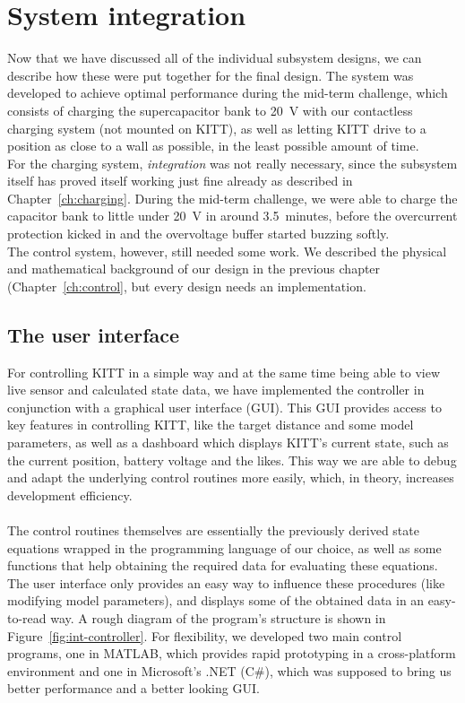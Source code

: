\documentclass[11pt,titlepage]{report}
\begin{document}
\chapter{System integration}
Now that we have discussed all of the individual subsystem designs, we can describe how these were put together for the final design. The system was developed to achieve optimal performance during the mid-term challenge, which consists of charging the supercapacitor bank to \SI{20}{V} with our contactless charging system (not mounted on KITT), as well as letting KITT drive to a position as close to a wall as possible, in the least possible amount of time. \\
For the charging system, \textit{integration} was not really necessary, since the subsystem itself has proved itself working just fine already as described in Chapter~\ref{ch:charging}. During the mid-term challenge, we were able to charge the capacitor bank to little under \SI{20}{V} in around \SI{3.5}{minutes}, before the overcurrent protection kicked in and the overvoltage buffer started buzzing softly.
\\
The control system, however, still needed some work. We described the physical and mathematical background of our design in the previous chapter (Chapter~\ref{ch:control}, but every design needs an implementation.

\section{The user interface}
For controlling KITT in a simple way and at the same time being able to view live sensor and calculated state data, we have implemented the controller in conjunction with a graphical user interface (GUI). This GUI provides access to key features in controlling KITT, like the target distance and some model parameters, as well as a dashboard which displays KITT's current state, such as the current position, battery voltage and the likes. This way we are able to debug and adapt the underlying control routines more easily, which, in theory, increases development efficiency.
\\\\
The control routines themselves are essentially the previously derived state equations wrapped in the programming language of our choice, as well as some functions that help obtaining the required data for evaluating these equations. The user interface only provides an easy way to influence these procedures (like modifying model parameters), and displays some of the obtained data in an easy-to-read way. A rough diagram of the program's structure is shown in Figure~\ref{fig:int-controller}. For flexibility, we developed two main control programs, one in MATLAB, which provides rapid prototyping in a cross-platform environment and one in Microsoft's .NET (C\#), which was supposed to bring us better performance and a better looking GUI.
\end{document}
